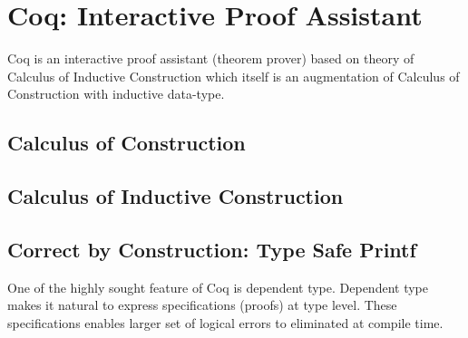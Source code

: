 \section{Coq: Interactive Proof Assistant}
\label{sec:problemstatement}
Coq  is an interactive proof assistant (theorem prover) based on
theory of Calculus of 
Inductive Construction \citep{Paulin-Mohring:1993:IDS:645891.671440} which itself is an 
augmentation of Calculus of Construction 
\citep{Coquand:1988:CC:47724.47725} with inductive data-type.  
 

\subsection{Calculus of Construction}
\label{sec:cc}
\subsection{Calculus of Inductive Construction}
\label{sec:cic}
 
 

    
 \subsection{Correct by Construction: Type Safe Printf}
 \label{sec:deplambda}
  One of the highly sought feature of Coq is dependent type. 
  Dependent 
  type makes  it natural to express specifications (proofs) 
  at type level. These specifications enables larger set of 
  logical errors to eliminated at compile time. 
  

